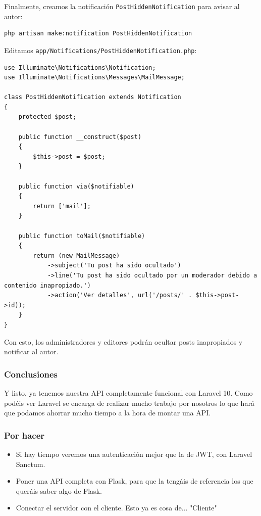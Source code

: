 \documentclass[11pt]{article}
\begin{document}
Finalmente, creamos la notificación \texttt{PostHiddenNotification} para avisar al autor:

\begin{verbatim}
php artisan make:notification PostHiddenNotification
\end{verbatim}

Editamos \texttt{app/Notifications/PostHiddenNotification.php}:

\begin{verbatim}
use Illuminate\Notifications\Notification;
use Illuminate\Notifications\Messages\MailMessage;

class PostHiddenNotification extends Notification
{
    protected $post;

    public function __construct($post)
    {
        $this->post = $post;
    }

    public function via($notifiable)
    {
        return ['mail'];
    }

    public function toMail($notifiable)
    {
        return (new MailMessage)
            ->subject('Tu post ha sido ocultado')
            ->line('Tu post ha sido ocultado por un moderador debido a contenido inapropiado.')
            ->action('Ver detalles', url('/posts/' . $this->post->id));
    }
}
\end{verbatim}

Con esto, los administradores y editores podrán ocultar posts
inapropiados y notificar al autor.

\subsubsection{Conclusiones}
\label{sec:orgd9bd96d}
Y listo, ya tenemos nuestra API completamente funcional con
Laravel 10. Como podéis ver Laravel se encarga de realizar mucho
trabajo por nosotros lo que hará que podamos ahorrar mucho tiempo a la
hora de montar una API.

\subsubsection{Por hacer}
\label{sec:orgb8c8b45}
\begin{itemize}
\item Si hay tiempo veremos una autenticación mejor que la de JWT, con
Laravel Sanctum.

\item Poner una API completa con Flask, para que la tengáis de referencia
los que queráis saber algo de Flask.

\item Conectar el servidor con el cliente. Esto ya es cosa de... "Cliente"
\end{itemize}
\end{document}
